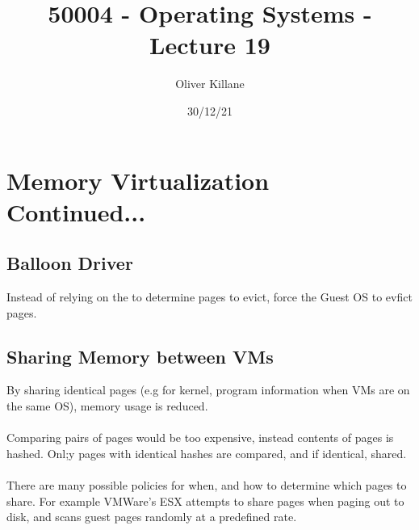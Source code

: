 \documentclass{report}
\title{50004 - Operating Systems - Lecture 19}
\author{Oliver Killane}
\date{30/12/21}
\begin{document}
    \maketitle

    \section*{Memory Virtualization Continued...}
        \subsection*{Balloon Driver}
            Instead of relying on the  to determine pages to evict, force the Guest OS to evfict pages.
        \subsection*{Sharing Memory between VMs}
            By sharing identical pages (e.g for kernel, program information when VMs are on the same OS), memory usage is reduced.
            \\
            \\ Comparing pairs of pages would be too expensive, instead contents of pages is hashed. Onl;y pages with identical hashes are compared, and if identical, shared.
            \\
            \\ There are many possible policies for when, and how to determine which pages to share. For example VMWare's ESX attempts to share pages when paging out to disk, and scans guest pages randomly at a predefined rate.
    
\end{document}
